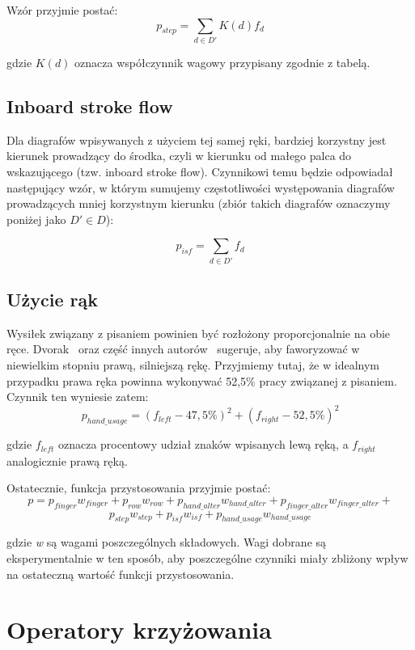 \documentclass{xmgr}
\begin{document}
Wzór przyjmie postać:
$$ p_{step} = \sum\limits_{d \in D'} K(d) f_d $$

gdzie $K(d)$ oznacza współczynnik wagowy przypisany zgodnie z tabelą.


\subsection{Inboard stroke flow}

Dla diagrafów wpisywanych z użyciem tej samej ręki, bardziej korzystny jest kierunek prowadzący do środka, czyli w kierunku od małego palca do wskazującego (tzw. inboard stroke flow). Czynnikowi temu będzie odpowiadał następujący wzór, w którym sumujemy częstotliwości występowania diagrafów prowadzących mniej korzystnym kierunku (zbiór takich diagrafów oznaczymy poniżej jako $ D' \in D $):

$$ p_{isf} = \sum\limits_{d \in D'} f_d $$


\subsection{Użycie rąk}

Wysiłek związany z pisaniem powinien być rozłożony proporcjonalnie na obie ręce. Dvorak~\cite{cassingham1986dvorak} oraz część innych autorów~\cite{Call:2005:CME} sugeruje, aby faworyzować w niewielkim stopniu prawą, silniejszą rękę. Przyjmiemy tutaj, że w idealnym przypadku prawa ręka powinna wykonywać 52,5\% pracy związanej z pisaniem. Czynnik ten wyniesie zatem:
$$ p_{hand\_usage} = (f_{left} - 47,5\%)^2 + (f_{right} - 52,5\%)^2 $$

gdzie $f_{left}$ oznacza procentowy udział znaków wpisanych lewą ręką, a $f_{right}$ analogicznie prawą ręką.\newline\newline


\noindent Ostatecznie, funkcja przystosowania przyjmie postać:
$$ p = p_{finger} w_{finger} + p_{row} w_{row} + p_{hand\_alter} w_{hand\_alter} + p_{finger\_alter} w_{finger\_alter} + $$
$$ p_{step} w_{step} + p_{isf} w_{isf} + p_{hand\_usage} w_{hand\_usage} $$

\noindent
gdzie \emph{w} są wagami poszczególnych składowych. Wagi dobrane są eksperymentalnie w ten sposób, aby poszczególne czynniki miały zbliżony wpływ na ostateczną wartość funkcji przystosowania.


\section{Operatory krzyżowania}
\end{document}
